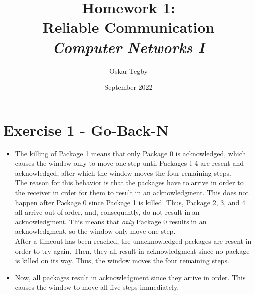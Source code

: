 \documentclass[10pt]{article}
\title{Homework 1: \\ Reliable Communication \\ \large \textit{Computer Networks I}}
\author{Oskar Tegby}
\date{September 2022}
\begin{document}
\maketitle


\section{Exercise 1 - Go-Back-N}
\begin{itemize}
  \item The killing of Package 1 means that only Package 0 is acknowledged, which causes the window only to move one step until Packages 1-4 are resent and acknowledged, after which the window moves the four remaining steps. \\
  
  The reason for this behavior is that the packages have to arrive in order to the receiver in order for them to result in an acknowledgment. This does not happen after Package 0 since Package 1 is killed. Thus, Package 2, 3, and 4 all arrive out of order, and, consequently, do not result in an acknowledgment. This means that \textit{only} Package 0 results in an acknowledgment, so the window only move one step. \\
  
  After a timeout has been reached, the unacknowledged packages are resent in order to try again. Then, they all result in acknowledgment since no package is killed on its way. Thus, the window moves the four remaining steps.
  \item Now, all packages result in acknowledgment since they arrive in order. This causes the window to move all five steps immediately. 
\end{itemize}
\end{document}
